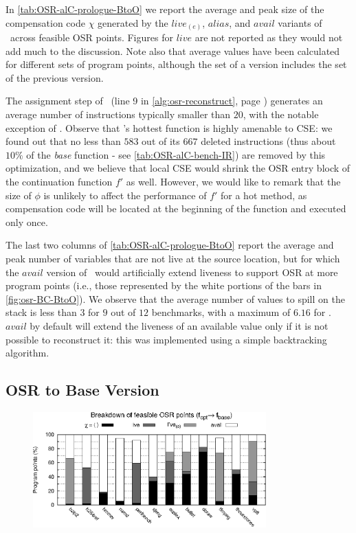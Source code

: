 In \mytable\ref{tab:OSR-alC-prologue-BtoO} we report the average and peak size of the compensation code $\chi$ generated by the $live_{(e)}$, $alias$, and $avail$ variants of \reconstruct\ across feasible OSR points. Figures for $live$ are not reported as they would not add much to the discussion. Note also that average values have been calculated for different sets of program points, although the set of a version includes the set of the previous version.

The assignment step of \reconstruct\ (line 9 in \myalgorithm\ref{alg:osr-reconstruct}, page \pageref{alg:osr-reconstruct}) generates an average number of instructions typically smaller than $20$, with the notable exception of . Observe that 's hottest function  is highly amenable to CSE: we found out that no less than $583$ out of its $667$ deleted instructions (thus about $10\%$ of the {\em base} function - see \mytable\ref{tab:OSR-alC-bench-IR}) are removed by this optimization, and we believe that local CSE would shrink the OSR entry block of the continuation function $f'$ as well. However, we would like to remark that the size of $\phi$ is unlikely to affect the performance of $f'$ for a hot method, as compensation code will be located at the beginning of the function and executed only once.

The last two columns of \mytable\ref{tab:OSR-alC-prologue-BtoO} report the average and peak number of variables that are not live at the source location, but for which the $avail$ version of \reconstruct\ would artificially extend liveness to support OSR at more program points (i.e., those represented by the white portions of the bars in \myfigure\ref{fig:osr-BC-BtoO}). We observe that the average number of values to spill on the stack is less than $3$ for $9$ out of $12$ benchmarks, with a maximum of $6.16$ for . $avail$ by default will extend the liveness of an available value only if it is not possible to reconstruct it: this was implemented using a simple backtracking algorithm.

\subsection{OSR to Base Version}

\begin{figure}[!b]
\begin{center}
\includegraphics[width=0.8\textwidth]{figures/osr-BC-OtoB/osr-BC-OtoB.eps}
\caption{\protect}
\end{center}
\end{figure}


